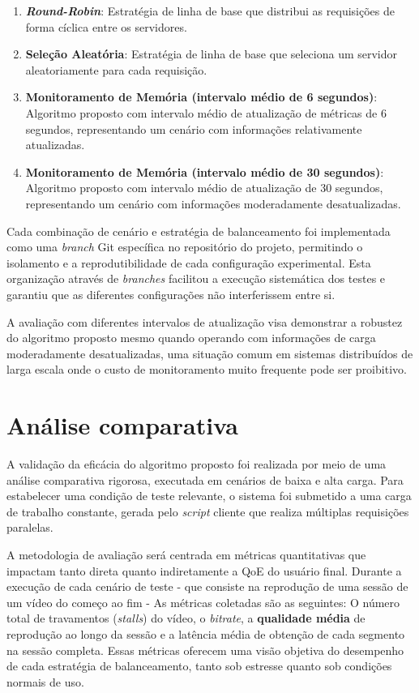 \begin{enumerate}
    \item \textbf{\textit{Round-Robin}}: Estratégia de linha de base que distribui as requisições de forma cíclica entre os servidores.
    
    \item \textbf{Seleção Aleatória}: Estratégia de linha de base que seleciona um servidor aleatoriamente para cada requisição.
    
    \item \textbf{Monitoramento de Memória (intervalo médio de 6 segundos)}: Algoritmo proposto com intervalo médio de atualização de métricas de 6 segundos, representando um cenário com informações relativamente atualizadas.
    
    \item \textbf{Monitoramento de Memória (intervalo médio de 30 segundos)}: Algoritmo proposto com intervalo médio de atualização de 30 segundos, representando um cenário com informações moderadamente desatualizadas.
\end{enumerate}

Cada combinação de cenário e estratégia de balanceamento foi implementada como uma \textit{branch} Git específica no repositório do projeto, permitindo o isolamento e a reprodutibilidade de cada configuração experimental. Esta organização através de \textit{branches} facilitou a execução sistemática dos testes e garantiu que as diferentes configurações não interferissem entre si.

A avaliação com diferentes intervalos de atualização visa demonstrar a robustez do algoritmo proposto mesmo quando operando com informações de carga moderadamente desatualizadas, uma situação comum em sistemas distribuídos de larga escala onde o custo de monitoramento muito frequente pode ser proibitivo.

\section{Análise comparativa}

A validação da eficácia do algoritmo proposto foi realizada por meio de uma análise comparativa rigorosa, executada em cenários de baixa e alta carga. Para estabelecer uma condição de teste relevante, o sistema foi submetido a uma carga de trabalho constante, gerada pelo \textit{script} cliente que realiza múltiplas requisições paralelas.

A metodologia de avaliação será centrada em métricas quantitativas que impactam tanto direta quanto indiretamente a QoE do usuário final. Durante a execução de cada cenário de teste - que consiste na reprodução de uma sessão de um vídeo do começo ao fim - As métricas coletadas são as seguintes: O número total de travamentos (\textit{stalls}) do vídeo, o \textit{bitrate}, a \textbf{qualidade média} de reprodução ao longo da sessão e a latência média de obtenção de cada segmento na sessão completa. Essas métricas oferecem uma visão objetiva do desempenho de cada estratégia de balanceamento, tanto sob estresse quanto sob condições normais de uso.

